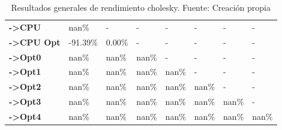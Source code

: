 \begin{table}[H]
\begin{tabular}{llllllll}
    \rowcolor[HTML]{EFEFEF} \cellcolor[HTML]{DAE8FC} \textbf{->CPU} & nan\% & - & - & - & - & - & - \\
    \cellcolor[HTML]{DAE8FC} \textbf{->CPU Opt} & -91.39\% & 0.00\% & - & - & - & - & - \\
    \rowcolor[HTML]{EFEFEF} \cellcolor[HTML]{DAE8FC} \textbf{->Opt0} & nan\% & nan\% & nan\% & - & - & - & - \\
    \cellcolor[HTML]{DAE8FC} \textbf{->Opt1} & nan\% & nan\% & nan\% & nan\% & - & - & - \\
    \rowcolor[HTML]{EFEFEF} \cellcolor[HTML]{DAE8FC} \textbf{->Opt2} & nan\% & nan\% & nan\% & nan\% & nan\% & - & - \\
    \cellcolor[HTML]{DAE8FC} \textbf{->Opt3} & nan\% & nan\% & nan\% & nan\% & nan\% & 	nan\% & - \\
    \rowcolor[HTML]{EFEFEF} \cellcolor[HTML]{DAE8FC} \textbf{->Opt4} & nan\% & nan\% & nan\% & nan\% & nan\% & 	nan\% & 	nan\% \\
    \end{tabular}
    \caption[Resultados generales de rendimiento cholesky]{{Resultados generales de rendimiento cholesky. Fuente: Creación propia}}
    \label{table_global_cholesky_PerformanceResults_speedup}
\end{table}